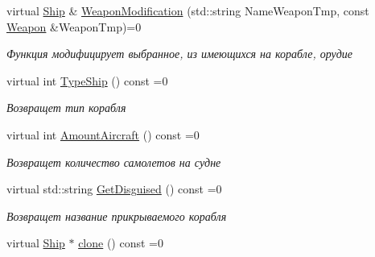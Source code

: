 \begin{DoxyCompactItemize}
virtual \mbox{\hyperlink{class_aircraft_carrier_group_1_1_ship}{Ship}} \& \mbox{\hyperlink{class_aircraft_carrier_group_1_1_ship_a3f91c1ad2960c095cfd88e85df0a3990}{Weapon\+Modification}} (std\+::string Name\+Weapon\+Tmp, const \mbox{\hyperlink{class_aircraft_carrier_group_1_1_weapon}{Weapon}} \&Weapon\+Tmp)=0
\begin{DoxyCompactList}\small\item\em Функция модифицирует выбранное, из имеющихся на корабле, орудие \end{DoxyCompactList}\item 
\mbox{\label{class_aircraft_carrier_group_1_1_ship_a27c9d24f1819cae895591fa51163e678}} 
virtual int \mbox{\hyperlink{class_aircraft_carrier_group_1_1_ship_a27c9d24f1819cae895591fa51163e678}{Type\+Ship}} () const =0
\begin{DoxyCompactList}\small\item\em Возвращет тип корабля \end{DoxyCompactList}\item 
\mbox{\label{class_aircraft_carrier_group_1_1_ship_a9121f438c35ce54745ab1cab229be222}} 
virtual int \mbox{\hyperlink{class_aircraft_carrier_group_1_1_ship_a9121f438c35ce54745ab1cab229be222}{Amount\+Aircraft}} () const =0
\begin{DoxyCompactList}\small\item\em Возвращет количество самолетов на судне \end{DoxyCompactList}\item 
\mbox{\label{class_aircraft_carrier_group_1_1_ship_a6455eb63c95dd3598b45b92e42e7f84d}} 
virtual std\+::string \mbox{\hyperlink{class_aircraft_carrier_group_1_1_ship_a6455eb63c95dd3598b45b92e42e7f84d}{Get\+Disguised}} () const =0
\begin{DoxyCompactList}\small\item\em Возвращет название прикрываемого корабля \end{DoxyCompactList}\item 
\mbox{\label{class_aircraft_carrier_group_1_1_ship_aec409c849026fa7d242fdd7de7ae9f02}} 
virtual \mbox{\hyperlink{class_aircraft_carrier_group_1_1_ship}{Ship}} $\ast$ \mbox{\hyperlink{class_aircraft_carrier_group_1_1_ship_aec409c849026fa7d242fdd7de7ae9f02}{clone}} () const =0

\end{DoxyCompactItemize}
